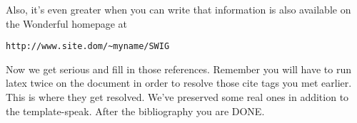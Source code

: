 \documentclass[letterpaper,twocolumn,10pt]{article}
\begin{document}
Also, it's even greater when you can write that information is also
available on the Wonderful homepage at

\begin{center}
{\tt http://www.site.dom/\~{}myname/SWIG}
\end{center}

Now we get serious and fill in those references.  Remember you will
have to run latex twice on the document in order to resolve those
cite tags you met earlier.  This is where they get resolved.
We've preserved some real ones in addition to the template-speak.
After the bibliography you are DONE.

{\footnotesize 
}


\theendnotes
\end{document}
